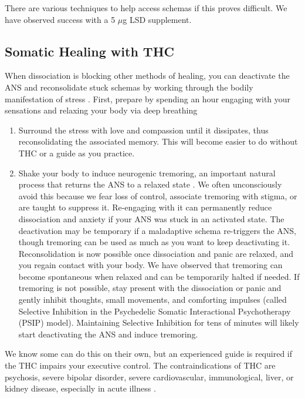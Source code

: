 \documentclass[12pt,letterpaper]{article}
\begin{document}
There are various techniques to help access schemas if this proves difficult. We have observed success with a 5 $\mu$g LSD supplement. 
\subsection{Somatic Healing with THC}
\label{psip}
When dissociation is blocking other methods of healing, you can deactivate the ANS and reconsolidate stuck schemas by working through the bodily manifestation of stress \cite{razviPSIP}. First, prepare by spending an hour engaging with your sensations and relaxing your body via deep breathing  
\begin{enumerate}
    \item Surround the stress with love and compassion until it dissipates, thus reconsolidating the associated memory. This will become easier to do without THC or a guide as you practice.
    \item Shake your body to induce neurogenic tremoring, an important natural process that returns the ANS to a relaxed state \cite{berceliTremor,razviPSIP}. We often unconsciously avoid this because we fear loss of control, associate tremoring with stigma, or are taught to suppress it. Re-engaging with it can permanently reduce dissociation and anxiety if your ANS was stuck in an activated state. The deactivation may be temporary if a maladaptive schema re-triggers the ANS, though tremoring can be used as much as you want to keep deactivating it. Reconsolidation is now possible once dissociation and panic are relaxed, and you regain contact with your body. We have observed that tremoring can become spontaneous when relaxed and can be temporarily halted if needed. If tremoring is not possible, stay present with the dissociation or panic and gently inhibit thoughts, small movements, and comforting impulses (called Selective Inhibition in the Psychedelic Somatic Interactional Psychotherapy (PSIP) model). Maintaining Selective Inhibition for tens of minutes will likely start deactivating the ANS and induce tremoring.
\end{enumerate}
We know some can do this on their own, but an experienced guide is required if the THC impairs your executive control. The contraindications of THC are psychosis, severe bipolar disorder, severe cardiovascular, immunological, liver, or kidney disease, especially in acute illness \cite{DCCannabis}.
\end{document}
